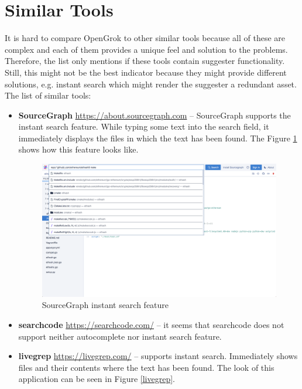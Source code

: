 \section{Similar Tools}
It is hard to compare OpenGrok to other similar tools because all of these are complex and each of them provides a unique
feel and solution to the problems.
Therefore, the list only mentions if these tools contain suggester functionality. Still, this might not be the best
indicator because they might provide different solutions, e.g. instant search which might render the suggester a redundant asset.
The list of similar tools:
\begin{itemize}
    \item \textbf{SourceGraph} \url{https://about.sourcegraph.com} – SourceGraph supports the instant search feature.
    While typing some text into the search field, it immediately displays the files in which the text has been found. The Figure
    \ref{sourcegraph} shows how this feature looks like.

    \begin{figure}[htbp]
        \centering
        \includegraphics[width=145mm]{../img/sourcegraph.png}
        \caption{SourceGraph instant search feature}
        \label{sourcegraph}
    \end{figure}

    \item \textbf{searchcode} \url{https://searchcode.com/} – it seems that searchcode does not support neither
    autocomplete nor instant search feature.

    \item \textbf{livegrep} \url{https://livegrep.com/} – supports instant search. Immediately shows files and their contents
    where the text has been found. The look of this application can be seen in Figure \ref{livegrep}.


\end{itemize}
